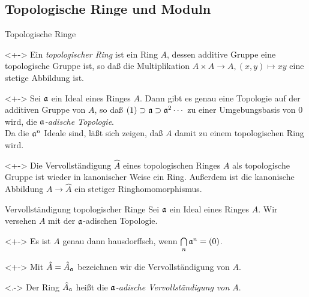 \subsection{Topologische Ringe und Moduln}

\begin{frame}{Topologische Ringe}
	\begin{definition}<+->
		Ein \emph{topologischer Ring} ist ein Ring \(A\), dessen additive Gruppe eine topologische Gruppe ist, so
		daß die Multiplikation \(A \times A \to A, (x, y) \mapsto x y\) eine stetige Abbildung ist.
	\end{definition}
	\begin{example}<+->
		Sei \(\mathfrak{a}\) ein Ideal eines Ringes \(A\). Dann gibt es genau eine Topologie auf
		der additiven Gruppe von \(A\), so daß \((1) \supset \mathfrak{a} \supset \mathfrak{a}^2 \dotsb\) zu einer
		Umgebungsbasis von \(0\) wird, die \emph{\(\mathfrak{a}\)-adische Topologie}.
		\\
		Da die \(\mathfrak{a}^n\) Ideale sind, läßt sich zeigen, daß \(A\) damit zu einem topologischen Ring wird.
	\end{example}
	\begin{remark}<+->
		Die Vervollständigung \(\hat A\) eines topologischen Ringes \(A\) als topologische Gruppe ist wieder in kanonischer Weise
		ein Ring. Außerdem ist die kanonische Abbildung \(A \to \hat A\) ein stetiger Ringhomomorphismus.
	\end{remark}
\end{frame}

\begin{frame}{Vervollständigung topologischer Ringe}
	Sei \(\mathfrak{a}\) ein Ideal eines Ringes \(A\). Wir versehen \(A\) mit der \(\mathfrak{a}\)-adischen Topologie.
	\begin{example}<+->
		Es ist \(A\) genau dann hausdorffsch, wenn \(\bigcap\limits_n \mathfrak{a}^n = (0)\).
	\end{example}
	\begin{visibleenv}<+->
		Mit \(\hat A = \hat A_{\mathfrak{a}}\) bezeichnen wir die Vervollständigung von \(A\).
	\end{visibleenv}
	\begin{definition}<.->
		Der Ring \(\hat A_{\mathfrak{a}}\) heißt die \emph{\(\mathfrak{a}\)-adische Vervollständigung von \(A\)}.
	\end{definition}
\end{frame}

